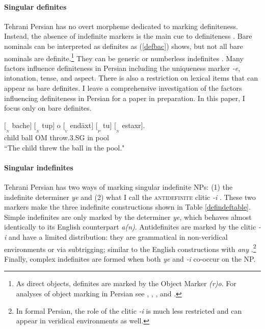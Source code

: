 \documentclass{salt}
\begin{document}
\paragraph {Singular definites} 

Tehrani Persian has no overt morpheme dedicated to marking definiteness. Instead, the absence of indefinite markers is the main cue to definiteness \cite[272]{moin1958}. Bare nominals can be interpreted as definites as (\ref {defbac}) shows, but not all bare nominals are definite.\footnote{As direct objects, definites are marked by the Object Marker \emph{(r)o}. For analyses of object marking in Persian see \cite{dabir1992dependence}, \cite{karimi2003object}, \cite{modarresi2014}, and \cite{jasbi2014}.} They can be generic or numberless indefinites \citep{toosarvandani2014quantification}. Many factors influence definiteness in Persian including the uniqueness marker \emph{-e}, intonation, tense, and aspect. There is also a restriction on lexical items that can appear as bare definites. I leave a comprehensive investigation of the factors influencing definiteness in Persian for a paper in preparation. In this paper, I focus only on bare definites. 

	\begin {exe}
		\ex \label {defbac}
			\gll 	$[_{_{N}}$ bache$]$	$[_{_{N}}$ tup$]$ o $[_{_{V}}$ end\={a}xt$]$ $[_{_{P}}$ tu$]$ $[_{_{N}}$ estaxr$]$.\\
					{} child	{} ball {\scriptsize OM} {} throw{\scriptsize .3.SG} {} in {} pool\\
			\glt 	``The child threw the ball in the pool."
	\end {exe}

\paragraph {Singular indefinites}
Tehrani Persian has two ways of marking singular indefinite NPs: (1) the indefinite determiner \emph{ye} and (2) what I call the \textsc{antidefinite} clitic \emph{-i} \citep{moin1958, ghomeshi2003plural, toosarvandani2014quantification}. These two markers make the three indefinite constructions shown in Table \ref{defindeftable}. Simple indefinites are only marked by the determiner \emph{ye}, which behaves almost identically to its English counterpart \emph{a(n)}. Antidefinites are marked by the clitic \emph{-i} and have a limited distribution: they are grammatical in non-veridical environments or via subtrigging; similar to the English constructions with \emph{any} \citep{leGrand75, dayal1998any}.\footnote{In formal Persian, the role of the clitic \emph{-i} is much less restricted and can appear in veridical environments as well.} Finally, complex indefinites are formed when both \emph{ye} and \emph{-i} co-occur on the NP.
\end{document}
